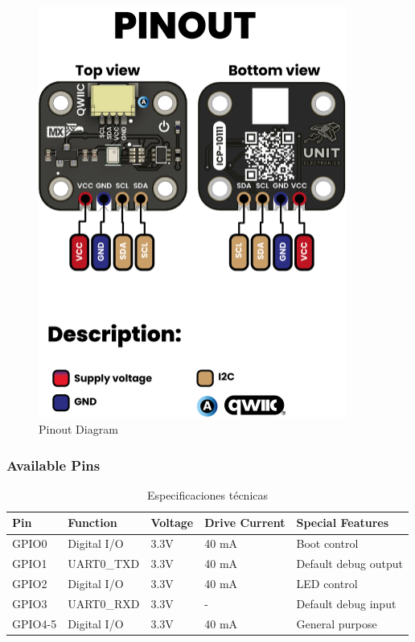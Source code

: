 \documentclass[11pt,a4paper]{article}
\begin{document}
\begin{figure}[H]
\centering
\includegraphics[width=0.9\textwidth]{en_unit_pinout_v_0_0_1_ue0094_icp10111_barometric_pressure_sensor_en.png}
\caption{Pinout Diagram}
\label{fig:en-unit-pinout-v-0-0-1-ue0094-icp10111-barometric-pressure-sensor-en-png}
\end{figure}



\subsubsection{Available Pins}


\begin{table}[H]
\centering
\small
\begin{tabular}{|l|l|l|l|l|}
\hline
Pin & Function & Voltage & Drive Current & Special Features \\
\hline
GPIO0 & Digital I/O & 3.3V & 40 mA & Boot control \\
GPIO1 & UART0_TXD & 3.3V & 40 mA & Default debug output \\
GPIO2 & Digital I/O & 3.3V & 40 mA & LED control \\
GPIO3 & UART0_RXD & 3.3V & - & Default debug input \\
GPIO4-5 & Digital I/O & 3.3V & 40 mA & General purpose \\
\hline
\end{tabular}
\caption{Especificaciones técnicas}
\end{table}
\end{document}
